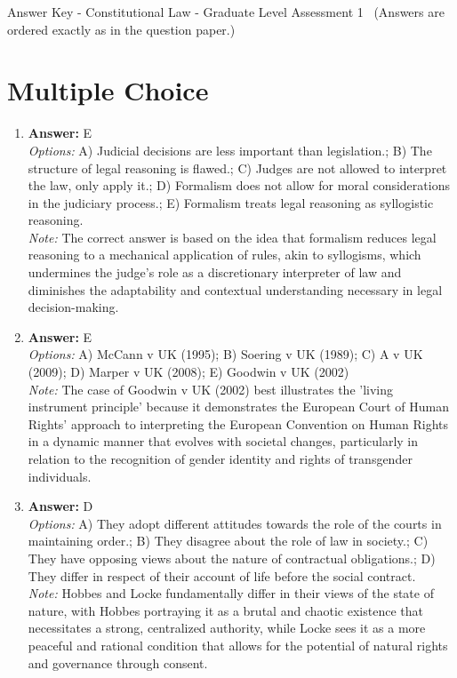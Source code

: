 \documentclass[12pt]{article}
\begin{document}
\begin{center}
Answer Key - Constitutional Law - Graduate Level Assessment 1 \
\small (Answers are ordered exactly as in the question paper.)
\end{center}

\section*{Multiple Choice}
\begin{enumerate}[label=\arabic*.]
\item \textbf{Answer:} E
\\ \textit{Options:} A) Judicial decisions are less important than legislation.; B) The structure of legal reasoning is flawed.; C) Judges are not allowed to interpret the law, only apply it.; D) Formalism does not allow for moral considerations in the judiciary process.; E) Formalism treats legal reasoning as syllogistic reasoning.
\\ \textit{Note:} The correct answer is based on the idea that formalism reduces legal reasoning to a mechanical application of rules, akin to syllogisms, which undermines the judge's role as a discretionary interpreter of law and diminishes the adaptability and contextual understanding necessary in legal decision-making.
\item \textbf{Answer:} E
\\ \textit{Options:} A) McCann v UK (1995); B) Soering v UK (1989); C) A v UK (2009); D) Marper v UK (2008); E) Goodwin v UK (2002)
\\ \textit{Note:} The case of Goodwin v UK (2002) best illustrates the 'living instrument principle' because it demonstrates the European Court of Human Rights' approach to interpreting the European Convention on Human Rights in a dynamic manner that evolves with societal changes, particularly in relation to the recognition of gender identity and rights of transgender individuals.
\item \textbf{Answer:} D
\\ \textit{Options:} A) They adopt different attitudes towards the role of the courts in maintaining order.; B) They disagree about the role of law in society.; C) They have opposing views about the nature of contractual obligations.; D) They differ in respect of their account of life before the social contract.
\\ \textit{Note:} Hobbes and Locke fundamentally differ in their views of the state of nature, with Hobbes portraying it as a brutal and chaotic existence that necessitates a strong, centralized authority, while Locke sees it as a more peaceful and rational condition that allows for the potential of natural rights and governance through consent.

\end{enumerate}
\end{document}
